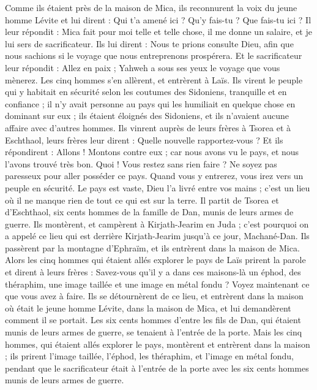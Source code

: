 \begin{multicols}{2}
Comme ils étaient près de la maison de Mica, ils reconnurent la voix du jeune homme Lévite et lui dirent : Qui t'a amené ici ? Qu'y fais-tu ? Que fais-tu ici ?
Il leur répondit : Mica fait pour moi telle et telle chose, il me donne un salaire, et je lui sers de sacrificateur.
Ils lui dirent : Nous te prions consulte Dieu, afin que nous sachions si le voyage que nous entreprenons prospérera.
Et le sacrificateur leur répondit : Allez en paix ; Yahweh a sous ses yeux le voyage que vous mènerez.
Les cinq hommes s'en allèrent, et entrèrent à Laïs. Ils virent le peuple qui y habitait en sécurité selon les coutumes des Sidoniens, tranquille et en confiance ; il n'y avait personne au pays qui les humiliait en quelque chose en dominant sur eux ; ils étaient éloignés des Sidoniens, et ils n'avaient aucune affaire avec d'autres hommes.
Ils vinrent auprès de leurs frères à Tsorea et à Eschthaol, leurs frères leur dirent : Quelle nouvelle rapportez-vous ?
Et ils répondirent : Allons ! Montons contre eux ; car nous avons vu le pays, et nous l'avons trouvé très bon. Quoi ! Vous restez sans rien faire ? Ne soyez pas paresseux pour aller posséder ce pays.
Quand vous y entrerez, vous irez vers un peuple en sécurité. Le pays est vaste, Dieu l'a livré entre vos mains ; c'est un lieu où il ne manque rien de tout ce qui est sur la terre.
Il partit de Tsorea et d'Eschthaol, six cents hommes de la famille de Dan, munis de leurs armes de guerre.
Ils montèrent, et campèrent à Kirjath-Jearim en Juda ; c'est pourquoi on a appelé ce lieu qui est derrière Kirjath-Jearim jusqu'à ce jour, Machané-Dan.
Ils passèrent par la montagne d'Ephraïm, et ils entrèrent dans la maison de Mica.
Alors les cinq hommes qui étaient allés explorer le pays de Laïs prirent la parole et dirent à leurs frères : Savez-vous qu'il y a dans ces maisons-là un éphod, des théraphim, une image taillée et une image en métal fondu ? Voyez maintenant ce que vous avez à faire.
Ils se détournèrent de ce lieu, et entrèrent dans la maison où était le jeune homme Lévite, dans la maison de Mica, et lui demandèrent comment il se portait.
Les six cents hommes d'entre les fils de Dan, qui étaient munis de leurs armes de guerre, se tenaient à l'entrée de la porte.
Mais les cinq hommes, qui étaient allés explorer le pays, montèrent et entrèrent dans la maison ; ils prirent l'image taillée, l'éphod, les théraphim, et l'image en métal fondu, pendant que le sacrificateur était à l'entrée de la porte avec les six cents hommes munis de leurs armes de guerre.

\end{multicols}
